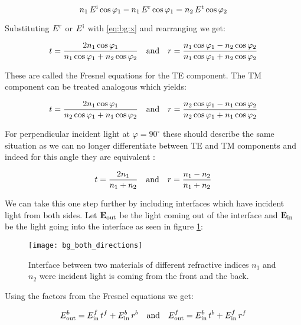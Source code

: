 \begin{equation}
    n_1 \, E^{\mathrm{i}} \cos \varphi_1 - n_1 \, E^{\mathrm{r}} \cos \varphi_1 =
    n_2 \, E^{\mathrm{t}} \cos \varphi_2
\end{equation}

Substituting $E^{\mathrm{r}}$ or $E^{\mathrm{i}}$ with \eqref{eq:bg:x} and rearranging we get:

\begin{equation}
    t = \frac{2 n_1 \cos \varphi_1}{n_1 \cos \varphi_1 + n_2 \cos \varphi_2}
    \qq{and}
    r = \frac{n_1 \cos \varphi_1 - n_2 \cos \varphi_2}{
    n_1 \cos \varphi_1 + n_2 \cos \varphi_2}
\end{equation}

These are called the Fresnel equations for the TE component. The TM component can be treated analogous which yields:

\begin{equation}
    t = \frac{2 n_1 \cos \varphi_1}{n_2 \cos \varphi_1 + n_1 \cos \varphi_2}
    \qq{and}
    r = \frac{n_2 \cos \varphi_1 - n_1 \cos \varphi_2}{
    n_2 \cos \varphi_1 + n_1 \cos \varphi_2}
\end{equation}

For perpendicular incident light at $\varphi = 90^\circ$ these should describe the same situation as we can no longer differentiate between TE and TM components and indeed for this angle they are equivalent :

\begin{equation}
    t = \frac{2 n_1}{n_1 + n_2} \qq{and} r = \frac{n_1 - n_2}{n_1 + n_2}
\end{equation}

We can take this one step further by including interfaces which have incident light from both sides. Let $\vb E_{\mathrm{out}}$ be the light coming out of the interface and $\vb E_{\mathrm{in}}$ be the light going into the interface as seen in figure \ref{fig:bg:both}:

\begin{figure}[H]
    \centering
    \texttt{[image: bg\_both\_directions]}
    \caption{Interface between two materials of different refractive indices $n_1$ and $n_2$ were incident light is coming from the front and the back.}
    \label{fig:bg:both}
\end{figure}

Using the factors from the Fresnel equations we get:

\begin{equation}
    E^b_\s{out} = E^f_\s{in} \, t^f + E^b_\s{in} \, r^b
    \qq{and}
    E^f_\s{out} = E^b_\s{in} \, t^b + E^f_\s{in} \, r^f
\end{equation}

